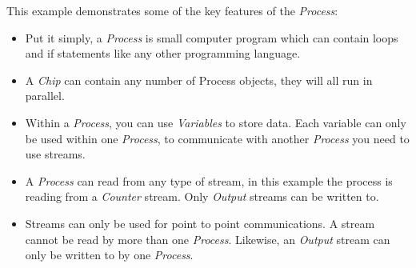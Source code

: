 \documentclass[letterpaper,10pt,english]{sphinxmanual}
\begin{document}
This example demonstrates some of the key features of the \emph{Process}:
\begin{itemize}
\item {} 
Put it simply, a \emph{Process} is small computer program which can contain loops
and if statements like any other programming language.

\item {} 
A \emph{Chip} can contain any number of Process objects, they will all run in
parallel.

\item {} 
Within a \emph{Process}, you can use \emph{Variables} to store data. Each variable can
only be used within one \emph{Process}, to communicate with another \emph{Process} you
need to use streams.

\item {} 
A \emph{Process} can read from any type of stream, in this example the process is
reading from a \emph{Counter} stream. Only \emph{Output} streams can be written to.

\item {} 
Streams can only be used for point to point communications. A stream cannot
be read by more than one \emph{Process}. Likewise, an \emph{Output} stream can only be
written to by one \emph{Process}.

\end{itemize}
\end{document}
